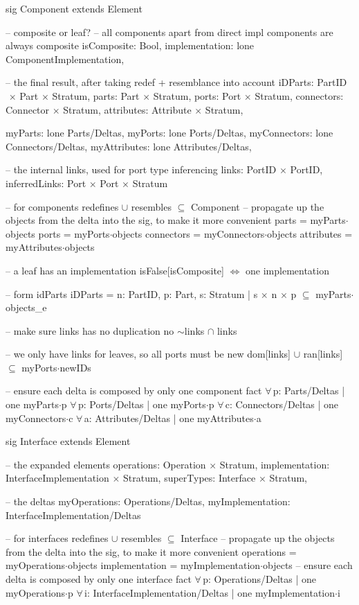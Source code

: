 sig Component extends Element
{
  -- composite or leaf?
  -- all components apart from direct impl components are always composite
  isComposite: Bool,
  implementation: lone ComponentImplementation,

  -- the final result, after taking redef + resemblance into account
  iDParts: PartID$\,\times\,$Part$\,\times\,$Stratum,
  parts: Part$\,\times\,$Stratum,
  ports: Port$\,\times\,$Stratum,
  connectors: Connector$\,\times\,$Stratum,
  attributes: Attribute$\,\times\,$Stratum,
  
  myParts: lone Parts/Deltas,
  myPorts: lone Ports/Deltas,
  myConnectors: lone Connectors/Deltas,
  myAttributes: lone Attributes/Deltas,
  
  -- the internal links, used for port type inferencing
  links: PortID$\,\times\,$PortID,
  inferredLinks: Port$\,\times\,$Port$\,\times\,$Stratum
}
{
  -- for components
  redefines $\cup$ resembles $\subseteq$ Component
  -- propagate up the objects from the delta into the sig, to make it more convenient
  parts = myParts$\cdot$objects
  ports = myPorts$\cdot$objects
  connectors = myConnectors$\cdot$objects
  attributes = myAttributes$\cdot$objects

  -- a leaf has an implementation
  isFalse[isComposite] $\Longleftrightarrow$ one implementation
  
  -- form idParts
  iDParts = {n: PartID, p: Part, s: Stratum | s$\,\times\,$n$\,\times\,$p $\subseteq$ myParts$\cdot$objects_e}
  
  -- make sure links has no duplication
  no  $\sim$links $\cap$ links
  
  -- we only have links for leaves, so all ports must be new
  dom[links] $\cup$ ran[links] $\subseteq$ myPorts$\cdot$newIDs
}

-- ensure each delta is composed by only one component
fact
{
  $\forall\,$p: Parts/Deltas | one myParts$\cdot$p
  $\forall\,$p: Ports/Deltas | one myPorts$\cdot$p
  $\forall\,$c: Connectors/Deltas | one myConnectors$\cdot$c
  $\forall\,$a: Attributes/Deltas | one myAttributes$\cdot$a
}

sig Interface extends Element
{
  -- the expanded elements
  operations: Operation$\,\times\,$Stratum,  
  implementation: InterfaceImplementation$\,\times\,$Stratum,  
  superTypes: Interface$\,\times\,$Stratum,

  -- the deltas
  myOperations: Operations/Deltas,
  myImplementation: InterfaceImplementation/Deltas
}
{
  -- for interfaces
  redefines $\cup$ resembles $\subseteq$ Interface
  -- propagate up the objects from the delta into the sig, to make it more convenient
  operations = myOperations$\cdot$objects  
  implementation = myImplementation$\cdot$objects
}
-- ensure each delta is composed by only one interface
fact
{
  $\forall\,$p: Operations/Deltas | one myOperations$\cdot$p
  $\forall\,$i: InterfaceImplementation/Deltas | one myImplementation$\cdot$i
}


